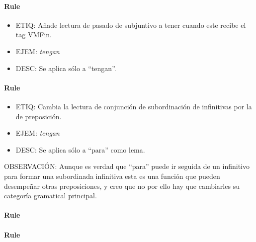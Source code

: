 \documentclass[11pt]{report}
\begin{document}
\paragraph*{Rule}
\begin{itemize}
\item ETIQ: Añade lectura de pasado de subjuntivo a tener cuando este recibe el tag VMFin. 
\item EJEM: \emph{tengan} 
\item DESC: Se aplica sólo a ``tengan''.
\end{itemize}

\paragraph*{Rule}
\begin{itemize}
\item ETIQ: Cambia la lectura de conjunción de subordinación de infinitivas por la de preposición. 
\item EJEM: \emph{tengan} 
\item DESC: Se aplica sólo a ``para'' como lema.
\end{itemize}

OBSERVACIÓN: Aunque es verdad que ``para'' puede ir seguida de un infinitivo para formar una subordinada infinitiva esta es una función que pueden desempeñar otras preposiciones, y creo que no por ello hay que cambiarles su categoría gramatical principal.

\paragraph*{Rule}
\paragraph*{Rule}
\end{document}
